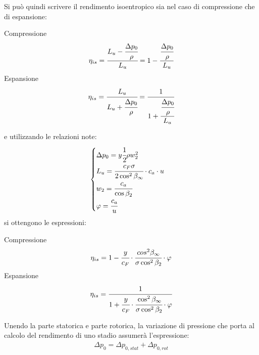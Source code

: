 Si può quindi scrivere il rendimento isoentropico sia nel caso di compressione che di espansione:
\begin{multicols}{2}
Compressione
\begin{align*}
\eta_{is} = \cfrac{L_u - \cfrac{\Delta p_0}{\rho}}{L_u} = 1- \cfrac{\cfrac{\Delta p_0}{\rho}}{L_u}
\end{align*}
\break
Espansione
\begin{align*}
\eta_{is} = \cfrac{L_u}{L_u + \cfrac{\Delta p_0}{\rho}} = \cfrac{1}{1+\cfrac{\cfrac{\Delta p_0}{\rho}}{L_u}}
\end{align*}
\end{multicols}
e utilizzando le relazioni note:
\begin{align*}
\begin{cases}
\Delta p_0 = y \cfrac{1}{2} \rho w_2^2\\
L_u = \cfrac{c_F \sigma}{2 \cos^2 \beta_{\infty}} \cdot c_a \cdot u\\
w_2 = \cfrac{c_a}{\cos \beta_2}\\
\varphi = \cfrac{c_a}{u}
\end{cases}
\end{align*}
si ottengono le espressioni:
\begin{multicols}{2}
Compressione
\begin{align*}
\eta_{is} = 1- \cfrac{y}{c_F} \cdot  \cfrac{cos^2 \beta_{\infty}}{\sigma \cos^2 \beta_2} \cdot \varphi
\end{align*}
\break
Espansione
\begin{align*}
\eta_{is} = \cfrac{1}{1+\cfrac{y}{c_F} \cdot \cfrac{\cos^2 \beta_{\infty}}{\sigma \cos^2 \beta_2} \cdot \varphi}
\end{align*}
\end{multicols}
Unendo la parte statorica e parte rotorica, la variazione di pressione che porta al calcolo del rendimento di uno stadio assumerà l'espressione:
\begin{align*}
\Delta p_0 = \Delta p_{0,stat} + \Delta p_{0,rot}
\end{align*}
